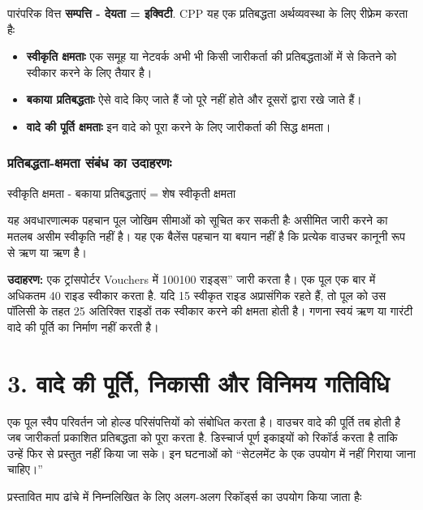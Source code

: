 \documentclass[11pt]{article}
\begin{document}
पारंपरिक वित्त \textbf{सम्पत्ति - देयता = इक्विटी}. CPP यह एक प्रतिबद्धता अर्थव्यवस्था के लिए रीफ्रेम करता हैः

\begin{itemize}[leftmargin=*]
\item \textbf{स्वीकृति क्षमताः} एक समूह या नेटवर्क अभी भी किसी जारीकर्ता की प्रतिबद्धताओं में से कितने को स्वीकार करने के लिए तैयार है।
\item \textbf{बकाया प्रतिबद्धताः} ऐसे वादे किए जाते हैं जो पूरे नहीं होते और दूसरों द्वारा रखे जाते हैं।
\item \textbf{वादे की पूर्ति क्षमताः} इन वादे को पूरा करने के लिए जारीकर्ता की सिद्ध क्षमता।
\end{itemize}
\subsubsection*{प्रतिबद्धता-क्षमता संबंध का उदाहरणः}

स्वीकृति क्षमता - बकाया प्रतिबद्धताएं = शेष स्वीकृती क्षमता

यह अवधारणात्मक पहचान पूल जोखिम सीमाओं को सूचित कर सकती हैः असीमित जारी करने का मतलब असीम स्वीकृति नहीं है। यह एक बैलेंस पहचान या बयान नहीं है कि प्रत्येक वाउचर कानूनी रूप से ऋण या ऋण है।

\textbf{उदाहरण:} एक ट्रांसपोर्टर Vouchers में 100100 राइड्स'' जारी करता है। एक पूल एक बार में अधिकतम 40 राइड स्वीकार करता है. यदि 15 स्वीकृत राइड अप्रासंगिक रहते हैं, तो पूल को उस पॉलिसी के तहत 25 अतिरिक्त राइडों तक स्वीकार करने की क्षमता होती है। गणना स्वयं ऋण या गारंटी वादे की पूर्ति का निर्माण नहीं करती है।



\section*{3. वादे की पूर्ति, निकासी और विनिमय गतिविधि}

एक पूल स्वैप परिवर्तन जो होल्ड परिसंपत्तियों को संबोधित करता है। वाउचर वादे की पूर्ति तब होती है जब जारीकर्ता प्रकाशित प्रतिबद्धता को पूरा करता है. डिस्चार्ज पूर्ण इकाइयों को रिकॉर्ड करता है ताकि उन्हें फिर से प्रस्तुत नहीं किया जा सके। इन घटनाओं को ``सेटलमेंट के एक उपयोग में नहीं गिराया जाना चाहिए।''

प्रस्तावित माप ढांचे में निम्नलिखित के लिए अलग-अलग रिकॉर्ड्स का उपयोग किया जाता हैः
\end{document}
